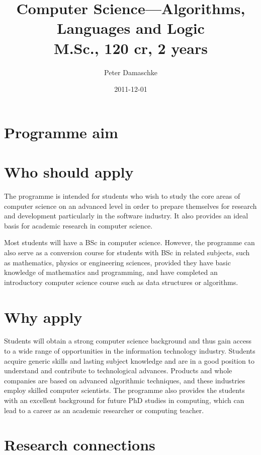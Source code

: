 \documentclass[twocolumn]{article}
\begin{document}
\title{Computer Science---Algorithms, Languages and Logic\\
M.Sc., 120 cr, 2 years}
\author{Peter Damaschke}
\date{2011-12-01}
\maketitle

\section{Programme aim}



\section{Who should apply}

The programme is intended for students who wish to study the core
areas of computer science on an advanced level in order to prepare
themselves for research and development particularly in the software
industry. It also provides an ideal basis for academic research in
computer science.
 
Most students will have a BSc in computer science. However, the
programme can also serve as a conversion course for students with BSc
in related subjects, such as mathematics, physics or engineering
sciences, provided they have basic knowledge of mathematics and
programming, and have completed an introductory computer science
course such as data structures or algorithms.

\section{Why apply}

Students will obtain a strong computer science background and thus
gain access to a wide range of opportunities in the information
technology industry.  Students acquire generic skills and lasting
subject knowledge and are in a good position to understand and
contribute to technological advances. Products and whole companies are
based on advanced algorithmic techniques, and these industries employ
skilled computer scientists. The programme also provides the students
with an excellent background for future PhD studies in computing,
which can lead to a career as an academic researcher or computing
teacher.

\section{Research connections}
\end{document}
